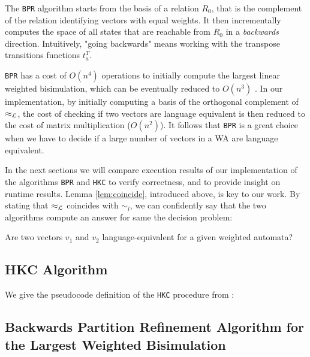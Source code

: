 The \texttt{BPR} algorithm starts from the basis of a relation $R_0$, that is the complement 
of the relation identifying vectors with equal weights.
It then incrementally computes the space of all states that are reachable from 
$R_0$ in a \textit{backwards} direction. Intuitively, "going backwards" means 
working with the transpose transitions functions $t_a^T$.

\texttt{BPR} has a cost of $O(n^4)$ operations 
to initially compute the largest linear weighted bisimulation,
which can be eventually reduced to $O(n^3)$ \cite{BONCHI201277}.
In our implementation, by initially computing a basis of the orthogonal complement of $\approx_{\mathcal{L}}$,
the cost of checking if two vectors are language equivalent is then reduced to the
cost of matrix multiplication ($O(n^2)$). It follows that 
\texttt{BPR} is a great choice when we
have to decide if a large number of vectors in a WA are language equivalent.


In the next sections we will compare execution results of our implementation of the algorithms
\texttt{BPR} and \texttt{HKC} to verify correctness,
and to provide insight on runtime results.
Lemma \ref{lem:coincide}, introduced above, is key to our work. By stating that 
$\approx_{\mathcal{L}}$ coincides with $\sim_l$, we can confidently say that the two algorithms 
compute an answer for same the decision problem:

\begin{center}
    Are two vectors $v_1$ and $v_2$ language-equivalent for a given weighted automata? 
\end{center}




\subsection{HKC Algorithm}
We give the pseudocode definition of the \texttt{HKC} procedure from \cite{DBLP:journals/corr/Bonchi0K17}:


\label{fig:hkc}

\subsection{Backwards Partition Refinement Algorithm for the Largest Weighted Bisimulation}
\label{sec:algo2}

